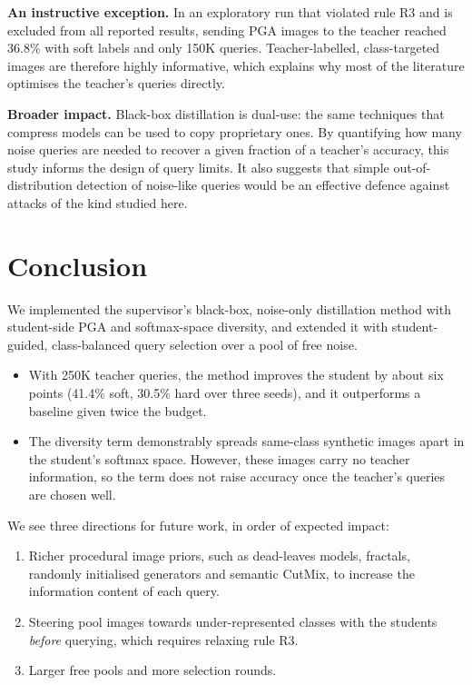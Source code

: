 \documentclass[
  10pt,
]{article}
\providecommand{\tightlist}{%
  \setlength{\itemsep}{0pt}\setlength{\parskip}{0pt}}
\begin{document}
\textbf{An instructive exception.} In an exploratory run that violated
rule R3 and is excluded from all reported results, sending PGA images to
the teacher reached 36.8\% with soft labels and only 150K queries.
Teacher-labelled, class-targeted images are therefore highly
informative, which explains why most of the literature optimises the
teacher's queries directly.

\textbf{Broader impact.} Black-box distillation is dual-use: the same
techniques that compress models can be used to copy proprietary ones. By
quantifying how many noise queries are needed to recover a given
fraction of a teacher's accuracy, this study informs the design of query
limits. It also suggests that simple out-of-distribution detection of
noise-like queries would be an effective defence against attacks of the
kind studied here.

\hypertarget{conclusion}{%
\section{Conclusion}\label{conclusion}}

We implemented the supervisor's black-box, noise-only distillation
method with student-side PGA and softmax-space diversity, and extended
it with student-guided, class-balanced query selection over a pool of
free noise.

\begin{itemize}
\tightlist
\item
  With 250K teacher queries, the method improves the student by about
  six points (41.4\% soft, 30.5\% hard over three seeds), and it
  outperforms a baseline given twice the budget.
\item
  The diversity term demonstrably spreads same-class synthetic images
  apart in the student's softmax space. However, these images carry no
  teacher information, so the term does not raise accuracy once the
  teacher's queries are chosen well.
\end{itemize}

We see three directions for future work, in order of expected impact:

\begin{enumerate}
\def\labelenumi{\arabic{enumi}.}
\tightlist
\item
  Richer procedural image priors, such as dead-leaves models, fractals,
  randomly initialised generators and semantic CutMix, to increase the
  information content of each query.
\item
  Steering pool images towards under-represented classes with the
  students \emph{before} querying, which requires relaxing rule R3.
\item
  Larger free pools and more selection rounds.
\end{enumerate}
\end{document}
